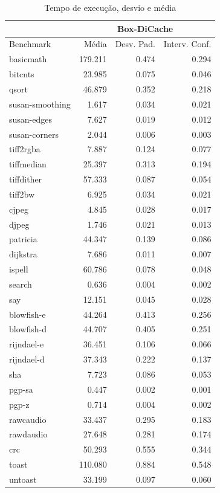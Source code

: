 \documentclass[11pt,twoside]{article}
\begin{document}
\begin{table}
 \caption{Tempo de execução, desvio e média}
 \begin{center}
 \begin{tabular}{|l|r|r|r|}
   \cline{2-4}
   \multicolumn{1}{c|}{}& \multicolumn{3}{|c|}{Box-DiCache} \\ \hline
   Benchmark & Média & Desv. Pad. & Interv. Conf.\\ \hline 
   basicmath & 179.211 & 0.474 & 0.294\\ \hline 
   bitcnts & 23.985 & 0.075 & 0.046\\ \hline 
   qsort & 46.879 & 0.352 & 0.218\\ \hline 
   susan-smoothing & 1.617 & 0.034 & 0.021\\ \hline 
   susan-edges & 7.627 & 0.019 & 0.012\\ \hline 
   susan-corners & 2.044 & 0.006 & 0.003\\ \hline 
   tiff2rgba & 7.887 & 0.124 & 0.077\\ \hline 
   tiffmedian & 25.397 & 0.313 & 0.194\\ \hline 
   tiffdither & 57.333 & 0.087 & 0.054\\ \hline 
   tiff2bw & 6.925 & 0.034 & 0.021\\ \hline 
   cjpeg & 4.845 & 0.028 & 0.017\\ \hline 
   djpeg & 1.746 & 0.021 & 0.013\\ \hline 
   patricia & 44.347 & 0.139 & 0.086\\ \hline 
   dijkstra & 7.686 & 0.011 & 0.007\\ \hline 
   ispell & 60.786 & 0.078 & 0.048\\ \hline 
   search & 0.636 & 0.004 & 0.002\\ \hline 
   say & 12.151 & 0.045 & 0.028\\ \hline 
   blowfish-e & 44.264 & 0.413 & 0.256\\ \hline 
   blowfish-d & 44.707 & 0.405 & 0.251\\ \hline 
   rijndael-e & 36.451 & 0.106 & 0.066\\ \hline 
   rijndael-d & 37.343 & 0.222 & 0.137\\ \hline 
   sha & 7.723 & 0.086 & 0.053\\ \hline 
   pgp-sa & 0.447 & 0.002 & 0.001\\ \hline 
   pgp-z & 0.714 & 0.004 & 0.002\\ \hline 
   rawcaudio & 33.437 & 0.295 & 0.183\\ \hline 
   rawdaudio & 27.648 & 0.281 & 0.174\\ \hline 
   crc & 50.293 & 0.555 & 0.344\\ \hline 
   toast & 110.080 & 0.884 & 0.548\\ \hline 
   untoast & 33.199 & 0.097 & 0.060\\
   \hline
  \end{tabular}
  \label{tab:tempos_boxdicache}
 \end{center}
\end{table}
\end{document}
